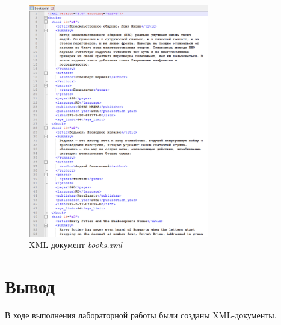 \documentclass[a4paper, 14pt]{extarticle}
\begin{document}
\begin{figure}[H]
  \centering
  \includegraphics[width=0.7\textwidth]{images/task-3/1.png}
  \caption{XML-документ \textit{\foreignlanguage{english}{books.xml}}}
  \label{fig:task-3:1}
\end{figure}

\section{Вывод}

В ходе выполнения лабораторной работы были созданы XML-документы.
\end{document}
